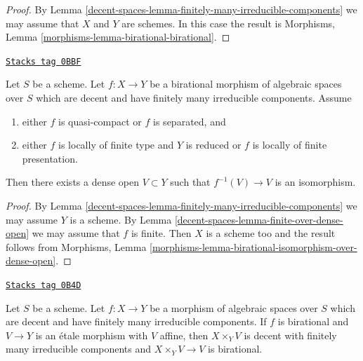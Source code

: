\begin{proof}
By Lemma \ref{decent-spaces-lemma-finitely-many-irreducible-components} we may assume
that $X$ and $Y$ are schemes. In this case the result is
Morphisms, Lemma \ref{morphisms-lemma-birational-birational}.
\end{proof}

\begin{lemma}
\label{decent-spaces-lemma-birational-isomorphism-over-dense-open}
\href{https://stacks.math.columbia.edu/tag/0BBF}{\texttt{Stacks tag 0BBF}}

Let $S$ be a scheme. Let $f : X \to Y$ be a birational morphism of
algebraic spaces over $S$ which are decent and have finitely
many irreducible components. Assume
\begin{enumerate}
\item either $f$ is quasi-compact or $f$ is separated, and
\item either $f$ is locally of finite type and $Y$ is reduced or
$f$ is locally of finite presentation.
\end{enumerate}
Then there exists a dense open $V \subset Y$
such that $f^{-1}(V) \to V$ is an isomorphism.
\end{lemma}

\begin{proof}
By Lemma \ref{decent-spaces-lemma-finitely-many-irreducible-components} we may assume
$Y$ is a scheme. By Lemma \ref{decent-spaces-lemma-finite-over-dense-open} we may assume
that $f$ is finite. Then $X$ is a scheme too and the result follows from
Morphisms, Lemma \ref{morphisms-lemma-birational-isomorphism-over-dense-open}.
\end{proof}

\begin{lemma}
\label{decent-spaces-lemma-birational-etale-localization}
\href{https://stacks.math.columbia.edu/tag/0B4D}{\texttt{Stacks tag 0B4D}}

Let $S$ be a scheme. Let $f : X \to Y$ be a morphism of algebraic
spaces over $S$ which are decent and have finitely many irreducible
components. If $f$ is birational and $V \to Y$ is an \'etale morphism
with $V$ affine, then $X \times_Y V$ is decent with finitely
many irreducible components and $X \times_Y V \to V$ is birational.
\end{lemma}

